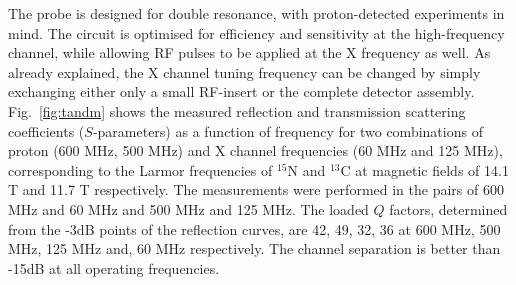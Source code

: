 \documentclass[preprint,5p]{elsarticle}
\newcommand{\fig}[1]{Fig.~\ref{#1}}
\begin{document}
The probe is designed for double resonance, with proton-detected experiments in
mind. The circuit is optimised for efficiency and sensitivity at the
high-frequency channel, while allowing RF pulses to be applied at the X
frequency as well. As already explained, the X channel tuning frequency can be
changed by simply exchanging either only a small RF-insert or the complete
detector assembly. \fig{fig:tandm} shows the measured reflection and
transmission scattering coefficients ($S$-parameters) as a function of frequency
for two combinations of proton (600 MHz, 500 MHz) and X channel frequencies (60
MHz and 125 MHz), corresponding to the Larmor frequencies of $^{15}$N and
$^{13}$C at magnetic fields of 14.1 T and 11.7 T respectively. The measurements
were performed in the pairs of 600 MHz and 60 MHz and 500 MHz and 125 MHz. The
loaded $Q$ factors, determined from the -3dB points of the reflection curves,
are 42, 49, 32, 36 at 600 MHz, 500 MHz, 125 MHz and, 60 MHz respectively. The
channel separation is better than -15dB at all operating frequencies.
\end{document}
